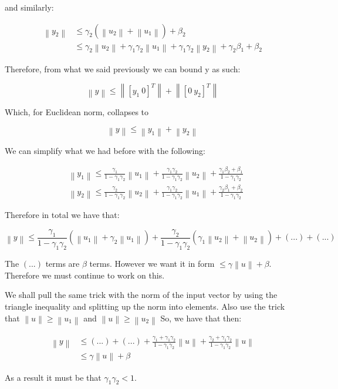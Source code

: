 \documentclass[11pt]{article}
\newcommand{\norm}[1]{\left\lVert#1\right\rVert}
\begin{document}
and similarly: 

\begin{align}
 \norm{y_2} & \leq \gamma_2 ( \norm{u_2} + \norm{u_1} ) + \beta_2 \\
 			& \leq \gamma_2 \norm{u_2} + \gamma_1 \gamma_2 \norm{u_1} + \gamma_1 \gamma_2 \norm{y_2} + \gamma_2 \beta_1 + \beta_2
\end{align}

Therefore, from what we said previously we can bound y as such:

\begin{equation}
	\norm{y} \leq \norm{ [ y_1 \  0 ]^T} + \norm{ [ 0 \  y_2 ]^T} 
\end{equation}

Which, for Euclidean norm, collapses to

\begin{equation}
	\norm{y} \leq \norm{ y_1 } + \norm{y_2} 
\end{equation}

We can simplify what we had before with the following: 


\begin{align}
& \norm{y_1} \leq \frac{\gamma_1}{1-\gamma_1\gamma_2}\norm{u_1} + \frac{\gamma_1\gamma_2}{1-\gamma_1\gamma_2}\norm{u_2} + \frac{\gamma_1 \beta_2 + \beta_1}{1-\gamma_1\gamma_2} \\
& \norm{y_2} \leq \frac{\gamma_2}{1-\gamma_1\gamma_2}\norm{u_2} + \frac{\gamma_1\gamma_2}{1-\gamma_1\gamma_2}\norm{u_1} + \frac{\gamma_2 \beta_1 + \beta_2}{1-\gamma_1\gamma_2}
\end{align}

Therefore in total we have that: 

\begin{equation}
	\norm{y} \leq \frac{\gamma_1}{1-\gamma_1\gamma_2}(\norm{u_1} + \gamma_2 \norm{u_1}) + \frac{\gamma_2}{1-\gamma_1\gamma_2}(\gamma_1\norm{u_2} + \norm{u_2} ) + (...) + (...)
\end{equation}

The $(...)$ terms are $\beta$ terms. However we want it in form $\leq \gamma\norm{u} + \beta$. Therefore we must continue to work on this.

We shall pull the same trick with the norm of the input vector by using the triangle inequality and splitting up the norm into elements. Also use the trick that $\norm{u} \geq \norm{u_1}$ and $\norm{u} \geq \norm{u_2}$  So, we have that then:

\begin{align}
	\norm{y} & \leq (...) + (...) + \frac{\gamma_1 +\gamma_1\gamma_2}{1-\gamma_1\gamma_2}\norm{u} + \frac{\gamma_2 +\gamma_1\gamma_2}{1-\gamma_1\gamma_2}\norm{u} \\
	& \leq \gamma \norm{u} + \beta
\end{align}

As a result it must be that $\gamma_1 \gamma_2 < 1$.



















\clearpage
% 
\end{document}
